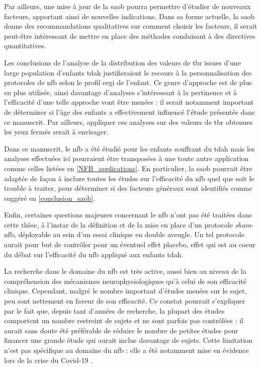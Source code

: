 Par ailleurs, une mise à jour de la \gls{saob} pourra permettre d'étudier de nouveaux facteurs, apportant ainsi de nouvelles  
indications. Dans sa forme actuelle, la \gls{saob} donne des recommandations qualitatives sur comment choisir les facteurs, 
il serait peut-être intéressant de mettre en place des méthodes conduisant à des directives quantitatives.

Les conclusions de l'analyse de la distribution des valeurs de \gls{tbr} issues d'une large population d'enfants \gls{tdah} justifieraient le recours à la 
personnalisation des protocoles de \gls{nfb} selon le profil \gls{eegi} de l'enfant. Ce genre d'approche est de plus en plus utilisée, ainsi davantage 
d'analyses s'intéressant
à la pertinence et à l'efficacité d'une telle approche vont être menées : il serait notamment important de déterminer si l'âge des enfants 
a effectivement influencé l'étude
présentée dans ce manuscrit. Par ailleurs, appliquer ces analyses sur des valeurs de \gls{tbr} obtenues les yeux fermés serait à envisager. 

Dans ce manuscrit, le \gls{nfb} a été étudié pour les enfants souffrant du \gls{tdah} mais les analyses effectuées ici pourraient être 
transposées à une toute autre application comme celles listées en \ref{NFB_applications}.
En particulier, la \gls{saob} pourrait être adaptée de façon à inclure toutes les études sur l'efficacité du \gls{nfb} 
quel que soit le trouble à traiter, pour déterminer si des facteurs généraux sont identifiés comme suggéré en \ref{conclusion_saob}. 

Enfin, certaines questions majeures concernant le \gls{nfb} n'ont pas été traitées dans cette thèse,
à l'instar de la définition et de la mise en place d'un protocole \textit{sham}-\gls{nfb}, déployable au sein d'un essai clinique en double aveugle. 
Un tel protocole 
aurait pour but de contrôler pour un éventuel effet placebo, effet qui est au coeur du débat sur l'efficacité du \gls{nfb} appliqué aux enfants \gls{tdah}. 

La recherche dans le domaine du \gls{nfb} est très active, aussi bien au niveau de la compréhension des mécanismes neurophysiologiques 
qu'à celui de son efficacité clinique.
Cependant, malgré le nombre important d'études menées sur le sujet, peu sont nettement en faveur de son efficacité. 
Ce constat pourrait s'expliquer par le fait que, depuis tant d'années de recherche, la plupart des études comportent un nombre
restreint de sujets et ne sont parfois pas contrôlées : il aurait sans doute été préférable de réduire le nombre de petites études pour financer une grande étude
qui aurait inclus davantage de sujets. Cette limitation n'est pas spécifique au domaine du \gls{nfb} : elle a été notamment mise en évidence lors de la crise du 
Covid-19 \citep{Gautret2020, Sanders2020}.

